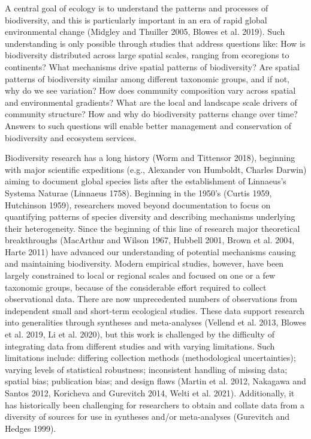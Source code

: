 \documentclass[
  12pt,
]{article}
\begin{document}
A central goal of ecology is to understand the patterns and processes of biodiversity, and this is particularly important in an era of rapid global environmental change (Midgley and Thuiller 2005, Blowes et al. 2019). Such understanding is only possible through studies that address questions like: How is biodiversity distributed across large spatial scales, ranging from ecoregions to continents? What mechanisms drive spatial patterns of biodiversity? Are spatial patterns of biodiversity similar among different taxonomic groups, and if not, why do we see variation? How does community composition vary across spatial and environmental gradients? What are the local and landscape scale drivers of community structure? How and why do biodiversity patterns change over time? Answers to such questions will enable better management and conservation of biodiversity and ecosystem services.

Biodiversity research has a long history (Worm and Tittensor 2018), beginning with major scientific expeditions (e.g., Alexander von Humboldt, Charles Darwin) aiming to document global species lists after the establishment of Linnaeus's Systema Naturae (Linnaeus 1758). Beginning in the 1950's (Curtis 1959, Hutchinson 1959), researchers moved beyond documentation to focus on quantifying patterns of species diversity and describing mechanisms underlying their heterogeneity. Since the beginning of this line of research major theoretical breakthroughs (MacArthur and Wilson 1967, Hubbell 2001, Brown et al. 2004, Harte 2011) have advanced our understanding of potential mechanisms causing and maintaining biodiversity. Modern empirical studies, however, have been largely constrained to local or regional scales and focused on one or a few taxonomic groups, because of the considerable effort required to collect observational data. There are now unprecedented numbers of observations from independent small and short-term ecological studies. These data support research into generalities through syntheses and meta-analyses (Vellend et al. 2013, Blowes et al. 2019, Li et al. 2020), but this work is challenged by the difficulty of integrating data from different studies and with varying limitations. Such limitations include: differing collection methods (methodological uncertainties); varying levels of statistical robustness; inconsistent handling of missing data; spatial bias; publication bias; and design flaws (Martin et al. 2012, Nakagawa and Santos 2012, Koricheva and Gurevitch 2014, Welti et al. 2021). Additionally, it has historically been challenging for researchers to obtain and collate data from a diversity of sources for use in syntheses and/or meta-analyses (Gurevitch and Hedges 1999).
\end{document}
